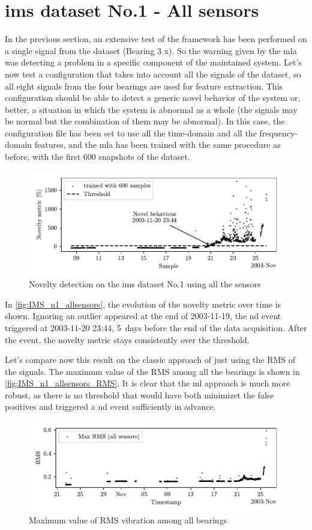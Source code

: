 \section{\gls{ims} dataset No.1 - All sensors}
In the previous section, an extensive test of the framework has been performed on a single signal from the dataset (Bearing 3 x). So the warning given by the \gls{mla} was detecting a problem in a specific component of the maintained system. Let's now test a configuration that takes into account all the signals of the dataset, so all eight signals from the four bearings are used for feature extraction. This configuration should be able to detect a generic novel behavior of the system or, better, a situation in which the system is abnormal as a whole (the signals may be normal but the combination of them may be abnormal).  In this case, the configuration file has been set to use all the time-domain and all the frequency-domain features, and the \gls{mla} has been trained with the same procedure as before, with the first 600 snapshots of the dataset. 


\begin{figure}
    \centering
    \includegraphics{images/IMS/Novelty_01_500samples_allsensors.pdf}
    \caption{Novelty detection on the \gls{ims} dataset No.1 using all the sensors}
    \label{fig:IMS_n1_allsensors}
\end{figure}

In \autoref{fig:IMS_n1_allsensors}, the evolution of the novelty metric over time is shown. Ignoring an outlier appeared at the end of 2003-11-19, the \gls{nd} event triggered at 2003-11-20 23:44, 5~days before the end of the data acquisition. After the event, the novelty metric stays consistently over the threshold.

Let's compare now this result on the classic approach of just using the RMS of the signals. The maximum value of the RMS among all the bearings is shown in \autoref{fig:IMS_n1_allsensors_RMS}. It is clear that the \gls{ml} approach is much more robust, as there is no threshold that would have both minimizet the false positives and triggered a \gls{nd} event sufficiently in advance.

\begin{figure}
    \centering
    \includegraphics{images/IMS/Novelty_01_RMS_allsensors.pdf}
    \caption{Maximum value of RMS vibration among all bearings}
    \label{fig:IMS_n1_allsensors_RMS}
\end{figure}